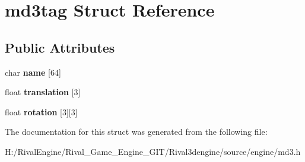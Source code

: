 \hypertarget{structmd3tag}{}\section{md3tag Struct Reference}
\label{structmd3tag}
\subsection*{Public Attributes}
\begin{DoxyCompactItemize}
\item 
\mbox{\label{structmd3tag_a9423ddfafe708c7ee03a328407e57281}} 
char {\bfseries name} \mbox{[}64\mbox{]}
\item 
\mbox{\label{structmd3tag_a117c4d87a91f671df72884adcf080241}} 
float {\bfseries translation} \mbox{[}3\mbox{]}
\item 
\mbox{\label{structmd3tag_ac2145e4348e3ed034d005876812053bc}} 
float {\bfseries rotation} \mbox{[}3\mbox{]}\mbox{[}3\mbox{]}
\end{DoxyCompactItemize}


The documentation for this struct was generated from the following file\+:\begin{DoxyCompactItemize}
\item 
H\+:/\+Rival\+Engine/\+Rival\+\_\+\+Game\+\_\+\+Engine\+\_\+\+G\+I\+T/\+Rival3dengine/source/engine/md3.\+h\end{DoxyCompactItemize}
